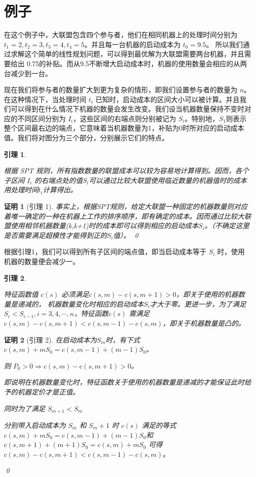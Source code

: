 \documentclass[UTF8]{article}
\newtheorem{lem}{\hspace{2em}引理}
\newtheorem{pf}{\hspace{2em}证明}
\begin{document}
\section{例子}
在这个例子中，大联盟包含四个参与者，他们在相同机器上的处理时间分别为 $t_1=2,t_2=3,t_3=4,t_4=5$。并且每一台机器的启动成本为 $t_0=9.5$。
所以我们通过求解这个简单的线性规划问题，可以得到最优解为大联盟需要两台机器，并且需要给出 0.75的补贴。而从9.5不断增大启动成本时，机器的使用数量会相应的从两台减少到一台。

现在我们将参与者的数量扩大到更为复杂的情形，即我们设置参与者的数量为 $n$。在这种情况下，当处理时间 $t_i$ 已知时，启动成本的区间大小可以被计算。并且我们可以得到在什么情况下机器的数量会发生改变。我们设当机器数量保持不变时对应的不同区间分别为 $I_i$，这些区间的右端点则分别被记为 $S_i$。特别地，$S_1$则表示整个区间最右边的端点，它意味着当机器数量为1，补贴为0时所对应的启动成本值。我们将对图分为三个部分，分别展示它们的特点。


\begin{lem}\label{lem1}

根据 SPT 规则，所有指数数量的联盟成本可以较为容易地计算得到。因而，各个子区间 $I_i$ 的右端点处的值$S_i$可以通过比较大联盟使用临近数量的机器值时的成本用处理时间$t_i$计算得出。

\end{lem}

\begin{pf}[引理 1]

事实上，根据SPT规则，给定大联盟一种固定的机器数量则对应着唯一确定的一种在机器上工作的排序顺序，即有确定的成本。因而通过比较大联盟使用相邻机器数量(k,k+1)时的成本即可以得到相应的启动成本$S_i$。（不确定这里是否需要满足超模性才能得到正的$S_i$值）。
\qed
\end{pf}

根据引理1，我们可以得到所有子区间的端点值，即当启动成本等于 $S_i$ 时，使用机器的数量便会减少一。

\begin{lem}\label{lem2}

特征函数值 $c(s)$ 必须满足$c(s,m) - c(s,m+1) > 0$，即关于使用的机器数量是递减的，
机器数量变化时相应的启动成本$S_i$才大于零。更进一步，为了满足$S_i < S_{i-1} , i=3,4,\cdots,n$，特征函数$c(s)$
需满足$c(s,m) - c(s,m+1) < c(s,m-1) - c(s,m)$，即关于机器数量是凸的。

\end{lem}

\begin{pf}[引理 2]
在启动成本为$S_m$时，有下式 $c(s,m)+mS_0 = c(s,m-1)+(m-1)S_0$。

则 $P_0 >0 \Rightarrow c(s,m) - c(s,m+1) > 0$。

即说明在机器数量变化时，特征函数关于使用的机器数量是递减的才能保证此时给予的机器定价才是正值。

同时为了满足 $S_{m+1} < S_m$

分别带入启动成本为 $S_m$ 和 $S_m+1$ 时 $c(s)$ 满足的等式
$c(s,m)+mS_0 = c(s,m-1)+(m-1)S_0$和$c(s,m+1)+(m+1)S_0 = c(s,m)+mS_0$
可得
$c(s,m)- c(s,m+1) < c(s,m-1)- c(s,m)$。

\qed
\end{pf}
\end{document}
